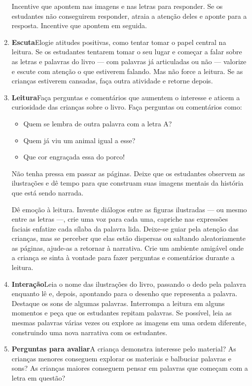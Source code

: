 \documentclass[11pt]{extarticle}
\begin{document}
\begin{enumerate}
Incentive que apontem nas imagens e nas letras para responder. Se os estudantes não 
conseguirem responder, atraia a atenção deles e aponte 
para a resposta. Incentive que apontem em seguida. 

\item \textbf{Escuta}\quad Elogie atitudes positivas, como 
tentar tomar o papel central na leitura. Se os estudantes tentarem 
tomar o seu lugar e começar a falar sobre as letras e palavras do livro --- com palavras já articuladas 
ou não --- valorize e escute com atenção o que estiverem falando. Mas não 
force a leitura. Se as crianças estiverem cansadas, faça outra atividade 
e retorne depois. 

\item \textbf{Leitura}\quad Faça perguntas e comentários que aumentem o 
interesse e aticem a curiosidade das crianças sobre o livro. Faça 
perguntas ou comentários como: 

\begin{itemize}
\item Quem se lembra de outra palavra com a letra A?
\item Quem já viu um animal igual a esse?
\item Que cor engraçada essa do porco!
\end{itemize}

Não tenha pressa em passar as páginas. Deixe que os estudantes 
observem as ilustrações e dê tempo para que construam suas imagens 
mentais da história que está sendo narrada. 

Dê emoção 
à leitura. Invente diálogos entre as figuras ilustradas --- ou mesmo entre as letras ---, crie uma voz para 
cada uma, capriche nas expressões faciais enfatize cada sílaba da palavra lida.
Deixe-se guiar pela atenção das crianças, mas se perceber que 
elas estão dispersas ou saltando aleatoriamente as páginas, ajude-as 
a retornar à narrativa. Crie um ambiente amigável onde a criança 
se sinta à vontade para fazer perguntas e comentários durante a leitura.

\item \textbf{Interação}\quad Leia o nome das ilustrações do livro, passando o dedo pela palavra enquanto lê e, depois, apontando para o desenho que representa a palavra.
Destaque os sons de algumas 
palavras. Interrompa a leitura em alguns momentos e peça que 
os estudantes repitam palavras. Se possível, 
leia as mesmas palavras várias vezes ou explore as imagens em uma ordem 
diferente, construindo uma nova narrativa com os estudantes. 

\item \textbf{Perguntas para avaliar}\quad A criança demonstra interesse pelo material? As crianças menores conseguem explorar os materiais e balbuciar palavras e sons? As crianças maiores conseguem pensar em palavras que começam com a letra em questão?
\end{enumerate}
\end{document}
